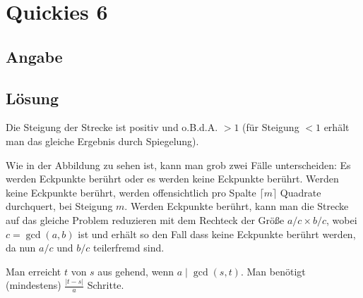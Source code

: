 \section*{Quickies 6}

\subsection*{Angabe}
%

\subsection*{Lösung}
\begin{flushenum}
\item
\begin{flushalpha}
	\item Die Steigung der Strecke ist positiv und o.B.d.A. $> 1$ (für Steigung $<1$ erhält man das gleiche Ergebnis durch Spiegelung).
	\begin{figure}[h!]
		\begin{center}
		\end{center}
	\end{figure}
	Wie in der Abbildung zu sehen ist, kann man grob zwei Fälle unterscheiden: Es werden Eckpunkte berührt oder es werden keine Eckpunkte berührt.
	Werden keine Eckpunkte berührt, werden offensichtlich pro Spalte $\lceil m \rceil$ Quadrate durchquert, bei Steigung $m$.
	Werden Eckpunkte berührt, kann man die Strecke auf das gleiche Problem reduzieren mit dem Rechteck der Größe $a/c \times b/c$,
	wobei $c = \gcd(a,b)$ ist und erhält so den Fall dass keine Eckpunkte berührt werden, da nun $a/c$ und $b/c$ teilerfremd sind.

	\item Man erreicht $t$ von $s$ aus gehend, wenn $a \mid \gcd(s,t)$. Man benötigt (mindestens) $\frac{|t-s|}{a}$ Schritte.


\end{flushalpha}
\end{flushenum}
